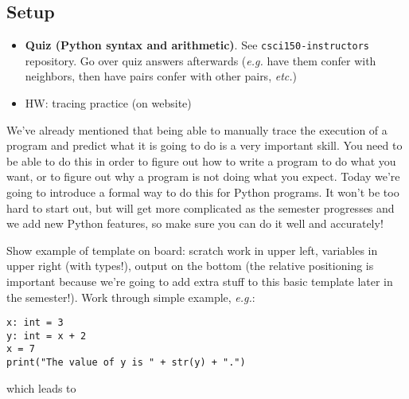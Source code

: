 \documentclass{article}
\newcommand{\etc}{\emph{etc.}\xspace}
\newcommand{\eg}{\emph{e.g.}\xspace}
\begin{document}
\subsection*{Setup}
\begin{itemize}
\item \textbf{Quiz (Python syntax and arithmetic)}.  See
  \texttt{csci150-instructors} repository.  Go over quiz answers
  afterwards (\eg have them confer with neighbors, then have
  pairs confer with other pairs, \etc)
\item HW: tracing practice (on website)
\end{itemize}

We've already mentioned that being able to manually trace the
execution of a program and predict what it is going to do is a very
important skill.  You need to be able to do this in order to figure
out how to write a program to do what you want, or to figure out why a
program is not doing what you expect.  Today we're going to introduce
a formal way to do this for Python programs.  It won't be too hard to
start out, but will get more complicated as the semester progresses
and we add new Python features, so make sure you can do it well and
accurately!

Show example of template on board: scratch work in upper left,
variables in upper right (with types!), output on the bottom (the
relative positioning is important because we're going to add extra
stuff to this basic template later in the semester!).  Work through
simple example, \eg:
\begin{verbatim}
x: int = 3
y: int = x + 2
x = 7
print("The value of y is " + str(y) + ".")
\end{verbatim}
which leads to \bigskip

 \bigskip
\end{document}

